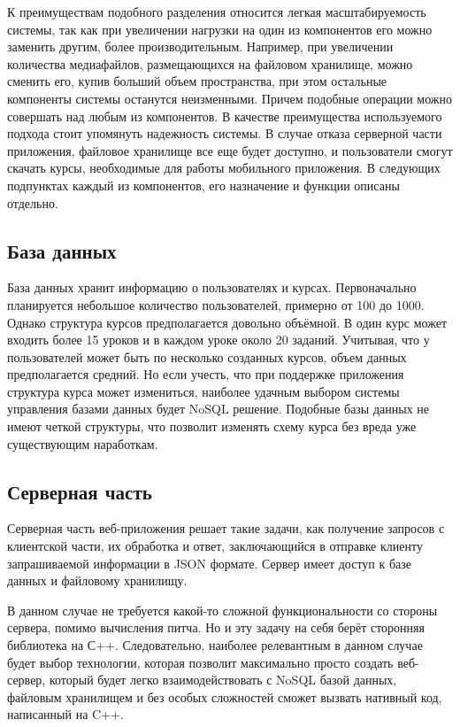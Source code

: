 \documentclass[%
  a5paper,
  subf,
  href,
  master,
  dotsinheaders 
]{csse-fcs}
\begin{document}
К преимуществам подобного разделения относится легкая масштабируемость системы, так как при увеличении нагрузки на один из компонентов его можно заменить другим, более производительным. Например, при увеличении количества медиафайлов, размещающихся на файловом хранилище, можно сменить его, купив больший объем пространства, при этом остальные компоненты системы останутся неизменными. Причем подобные операции можно совершать над любым из компонентов. В качестве преимущества используемого подхода стоит упомянуть надежность системы. В случае отказа серверной части приложения, файловое хранилище все еще будет доступно, и пользователи смогут скачать курсы, необходимые для работы мобильного приложения. В следующих подпунктах каждый из компонентов, его назначение и функции описаны отдельно.


\subsection{База данных}

База данных хранит информацию о пользователях и курсах. Первоначально планируется небольшое количество пользователей, примерно от 100 до 1000. Однако структура курсов предполагается довольно объёмной. В один курс может входить более 15 уроков и в каждом уроке около 20 заданий. Учитывая, что у пользователей может быть по несколько созданных курсов, объем данных предполагается средний. Но если учесть, что при поддержке приложения структура курса может измениться, наиболее удачным выбором системы управления базами данных будет NoSQL решение. Подобные базы данных не имеют четкой структуры, что позволит изменять схему курса без вреда уже существующим наработкам.

\subsection{Серверная часть}

Серверная часть веб-приложения решает такие задачи, как получение запросов с клиентской части, их обработка и ответ, заключающийся в отправке клиенту запрашиваемой информации в JSON формате. Сервер имеет доступ к базе данных и файловому хранилищу. 

В данном случае не требуется какой-то сложной функциональности со стороны сервера, помимо вычисления питча. Но и эту задачу на себя берёт сторонняя библиотека на С++. Следовательно, наиболее релевантным в данном случае будет выбор технологии, которая позволит максимально просто создать веб-сервер, который будет легко взаимодействовать с NoSQL базой данных, файловым хранилищем и без особых сложностей сможет вызвать нативный код, написанный на C++.
\end{document}
